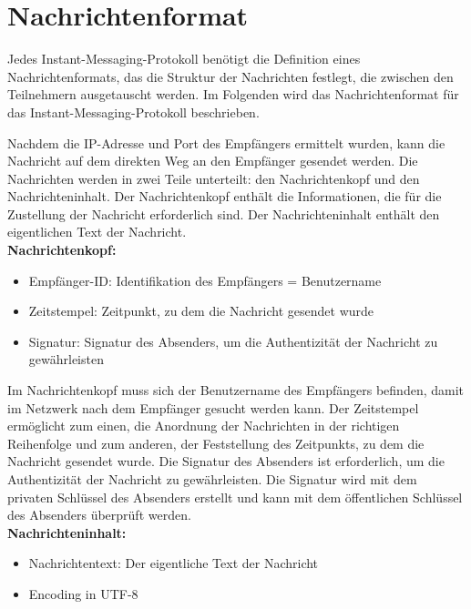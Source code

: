 \section{Nachrichtenformat}

Jedes Instant-Messaging-Protokoll benötigt die Definition eines Nachrichtenformats, das die Struktur der Nachrichten festlegt, die zwischen den Teilnehmern ausgetauscht werden. Im Folgenden wird das Nachrichtenformat für das Instant-Messaging-Protokoll beschrieben. 

Nachdem die IP-Adresse und Port des Empfängers ermittelt wurden, kann die Nachricht auf dem direkten Weg an den Empfänger gesendet werden. Die Nachrichten werden in zwei Teile unterteilt: den Nachrichtenkopf und den Nachrichteninhalt. Der Nachrichtenkopf enthält die Informationen, die für die Zustellung der Nachricht erforderlich sind. Der Nachrichteninhalt enthält den eigentlichen Text der Nachricht. 
\\

\noindent \textbf{Nachrichtenkopf:}
\begin{itemize}
    \item Empfänger-ID: Identifikation des Empfängers = Benutzername
    \item Zeitstempel: Zeitpunkt, zu dem die Nachricht gesendet wurde
    \item Signatur: Signatur des Absenders, um die Authentizität der Nachricht zu gewährleisten
\end{itemize}

\noindent Im Nachrichtenkopf muss sich der Benutzername des Empfängers befinden, damit im Netzwerk nach dem Empfänger gesucht werden kann. Der Zeitstempel ermöglicht zum einen, die Anordnung der Nachrichten in der richtigen Reihenfolge und zum anderen, der Feststellung des Zeitpunkts, zu dem die Nachricht gesendet wurde. Die Signatur des Absenders ist erforderlich, um die Authentizität der Nachricht zu gewährleisten. Die Signatur wird mit dem privaten Schlüssel des Absenders erstellt und kann mit dem öffentlichen Schlüssel des Absenders überprüft werden.
\\


\noindent \textbf{Nachrichteninhalt:}
\begin{itemize}
    \item Nachrichtentext: Der eigentliche Text der Nachricht
    \item Encoding in UTF-8
\end{itemize}

